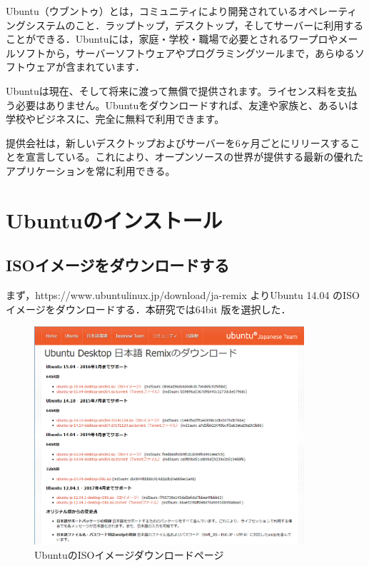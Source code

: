 Ubuntu（ウブントゥ）とは，コミュニティにより開発されているオペレーティングシステムのこと．ラップトップ，デスクトップ，そしてサーバーに利用することができる．Ubuntuには，家庭・学校・職場で必要とされるワープロやメールソフトから，サーバーソフトウェアやプログラミングツールまで，あらゆるソフトウェアが含まれています．

Ubuntuは現在、そして将来に渡って無償で提供されます。ライセンス料を支払う必要はありません。Ubuntuをダウンロードすれば、友達や家族と、あるいは学校やビジネスに、完全に無料で利用できます。

提供会社は，新しいデスクトップおよびサーバーを6ヶ月ごとにリリースすることを宣言している。これにより、オープンソースの世界が提供する最新の優れたアプリケーションを常に利用できる。

\section{Ubuntuのインストール}

\subsection{ISOイメージをダウンロードする}

まず，https://www.ubuntulinux.jp/download/ja-remix よりUbuntu 14.04 のISO イメージをダウンロードする．本研究では64bit 版を選択した．



\begin{figure}[H]
\centering
\includegraphics[width=10cm]{UbuntuDL.png}
\caption{UbuntuのISOイメージダウンロードページ}\label{サンプル図}
\end{figure}






